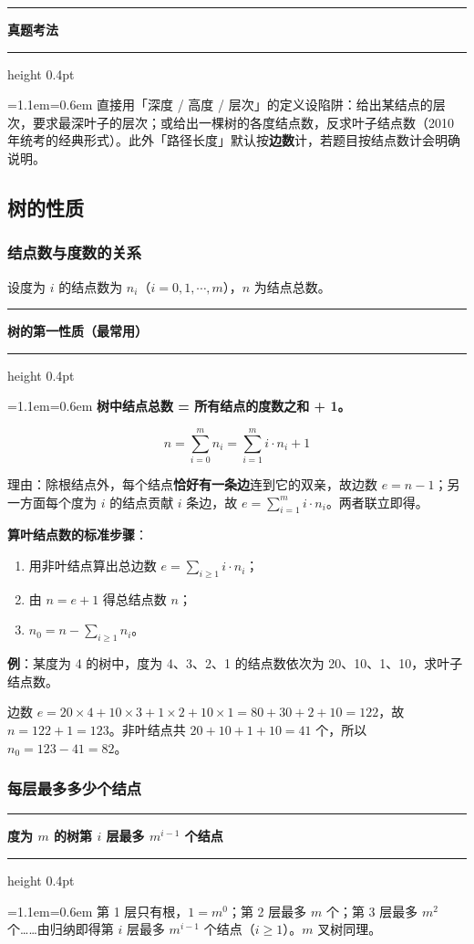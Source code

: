 \documentclass[11pt,openany,UTF8]{ctexbook}
\newcommand{\callouthead}[2]{%
  \par\addvspace{7pt}\noindent
  {\color{#1}\rule[-0.15em]{3pt}{1.05em}}\hspace{0.5em}%
  {\bfseries\color{#1}#2}\par\nobreak\vspace{-0.35em}%
  {\color{rulesep}\hrule height 0.4pt}\nobreak\vspace{0.45em}%
  \begingroup\small\setlength{\parindent}{0pt}%
  \leftskip=1.1em\rightskip=0.6em\noindent\ignorespaces}
\newcommand{\calloutend}{\par\endgroup\addvspace{7pt}}
\newenvironment{callkey}[1]{\callouthead{keybar}{#1}}{\calloutend}
\newenvironment{callexam}[1]{\callouthead{exambar}{#1}}{\calloutend}
\begin{document}
\begin{callexam}{真题考法}
直接用「深度 / 高度 / 层次」的定义设陷阱：给出某结点的层次，要求最深叶子的层次；或给出一棵树的各度结点数，反求叶子结点数（2010 年统考的经典形式）。此外「路径长度」默认按\textbf{边数}计，若题目按结点数计会明确说明。

\end{callexam}

\subsection{树的性质}

\subsubsection{结点数与度数的关系}

设度为 $i$ 的结点数为 $n_i$（$i=0,1,\cdots,m$），$n$ 为结点总数。

\begin{callkey}{树的第一性质（最常用）}
\textbf{树中结点总数 = 所有结点的度数之和 + 1。}

\[n=\sum_{i=0}^{m}n_i=\sum_{i=1}^{m} i\cdot n_i+1\]

理由：除根结点外，每个结点\textbf{恰好有一条边}连到它的双亲，故边数 $e=n-1$；另一方面每个度为 $i$ 的结点贡献 $i$ 条边，故 $e=\sum\limits_{i=1}^{m} i\cdot n_i$。两者联立即得。

\end{callkey}

\textbf{算叶结点数的标准步骤}：

\begin{enumerate}
\item 用非叶结点算出总边数 $e=\sum\limits_{i\ge 1} i\cdot n_i$；
\item 由 $n=e+1$ 得总结点数 $n$；
\item $n_0=n-\sum\limits_{i\ge 1}n_i$。
\end{enumerate}
\textbf{例}：某度为 4 的树中，度为 4、3、2、1 的结点数依次为 20、10、1、10，求叶子结点数。

边数 $e=20\times4+10\times3+1\times2+10\times1=80+30+2+10=122$，故 $n=122+1=123$。非叶结点共 $20+10+1+10=41$ 个，所以 $n_0=123-41=82$。

\subsubsection{每层最多多少个结点}

\begin{callkey}{度为 $m$ 的树第 $i$ 层最多 $m^{i-1}$ 个结点}
第 1 层只有根，$1=m^0$；第 2 层最多 $m$ 个；第 3 层最多 $m^2$ 个……由归纳即得第 $i$ 层最多 $m^{i-1}$ 个结点（$i\ge 1$）。$m$ 叉树同理。

\end{callkey}
\end{document}
